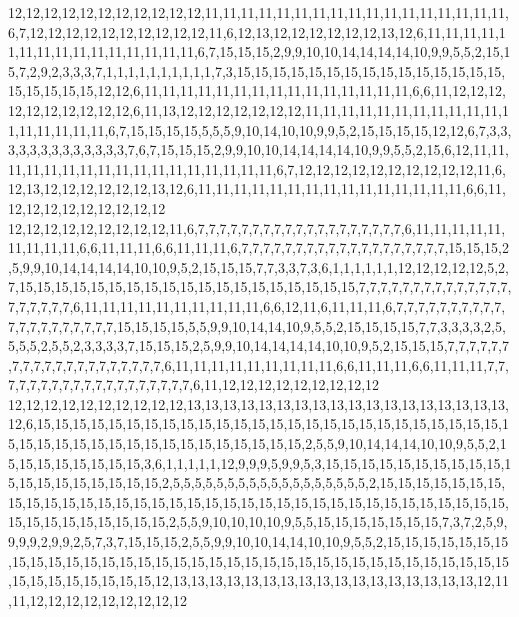 12,12,12,12,12,12,12,12,12,12,12,11,11,11,11,11,11,11,11,11,11,11,11,11,11,11,11,11,6,7,12,12,12,12,12,12,12,12,12,12,11,6,12,13,12,12,12,12,12,12,13,12,6,11,11,11,11,11,11,11,11,11,11,11,11,11,11,11,6,7,15,15,15,2,9,9,10,10,14,14,14,14,10,9,9,5,5,2,15,15,7,2,9,2,3,3,3,7,1,1,1,1,1,1,1,1,1,1,7,3,15,15,15,15,15,15,15,15,15,15,15,15,15,15,15,15,15,15,15,15,12,12,6,11,11,11,11,11,11,11,11,11,11,11,11,11,11,11,6,6,11,12,12,12,12,12,12,12,12,12,12,6,11,13,12,12,12,12,12,12,12,11,11,11,11,11,11,11,11,11,11,11,11,11,11,11,11,11,6,7,15,15,15,15,5,5,5,9,10,14,10,10,9,9,5,2,15,15,15,15,12,12,6,7,3,3,3,3,3,3,3,3,3,3,3,3,3,7,6,7,15,15,15,2,9,9,10,10,14,14,14,14,10,9,9,5,5,2,15,6,12,11,11,11,11,11,11,11,11,11,11,11,11,11,11,11,11,11,6,7,12,12,12,12,12,12,12,12,12,12,11,6,12,13,12,12,12,12,12,12,13,12,6,11,11,11,11,11,11,11,11,11,11,11,11,11,11,11,6,6,11,12,12,12,12,12,12,12,12,12
12,12,12,12,12,12,12,12,12,11,6,7,7,7,7,7,7,7,7,7,7,7,7,7,7,7,7,7,7,7,6,11,11,11,11,11,11,11,11,11,6,6,11,11,11,6,6,11,11,11,6,7,7,7,7,7,7,7,7,7,7,7,7,7,7,7,7,7,7,7,15,15,15,2,5,9,9,10,14,14,14,14,10,10,9,5,2,15,15,15,7,7,3,3,7,3,6,1,1,1,1,1,1,12,12,12,12,12,5,2,7,15,15,15,15,15,15,15,15,15,15,15,15,15,15,15,15,15,15,15,7,7,7,7,7,7,7,7,7,7,7,7,7,7,7,7,7,7,7,7,6,11,11,11,11,11,11,11,11,11,11,6,6,12,11,6,11,11,11,6,7,7,7,7,7,7,7,7,7,7,7,7,7,7,7,7,7,7,7,7,15,15,15,15,5,5,9,9,10,14,14,10,9,5,5,2,15,15,15,15,7,7,3,3,3,3,2,5,5,5,5,2,5,5,2,3,3,3,3,7,15,15,15,2,5,9,9,10,14,14,14,14,10,10,9,5,2,15,15,15,7,7,7,7,7,7,7,7,7,7,7,7,7,7,7,7,7,7,7,7,6,11,11,11,11,11,11,11,11,11,6,6,11,11,11,6,6,11,11,11,7,7,7,7,7,7,7,7,7,7,7,7,7,7,7,7,7,7,7,6,11,12,12,12,12,12,12,12,12,12
12,12,12,12,12,12,12,12,12,12,13,13,13,13,13,13,13,13,13,13,13,13,13,13,13,13,13,13,12,6,15,15,15,15,15,15,15,15,15,15,15,15,15,15,15,15,15,15,15,15,15,15,15,15,15,15,15,15,15,15,15,15,15,15,15,15,15,15,15,15,15,15,15,2,5,5,9,10,14,14,14,10,10,9,5,5,2,15,15,15,15,15,15,15,15,3,6,1,1,1,1,1,12,9,9,9,5,9,9,5,3,15,15,15,15,15,15,15,15,15,15,15,15,15,15,15,15,15,15,15,2,5,5,5,5,5,5,5,5,5,5,5,5,5,5,5,5,5,5,2,15,15,15,15,15,15,15,15,15,15,15,15,15,15,15,15,15,15,15,15,15,15,15,15,15,15,15,15,15,15,15,15,15,15,15,15,15,15,15,15,15,15,15,15,2,5,5,9,10,10,10,10,9,5,5,15,15,15,15,15,15,15,7,3,7,2,5,9,9,9,9,2,9,9,2,5,7,3,7,15,15,15,2,5,5,9,9,10,10,14,14,10,10,9,5,5,2,15,15,15,15,15,15,15,15,15,15,15,15,15,15,15,15,15,15,15,15,15,15,15,15,15,15,15,15,15,15,15,15,15,15,15,15,15,15,15,15,15,15,15,12,13,13,13,13,13,13,13,13,13,13,13,13,13,13,13,13,13,12,11,11,12,12,12,12,12,12,12,12,12
